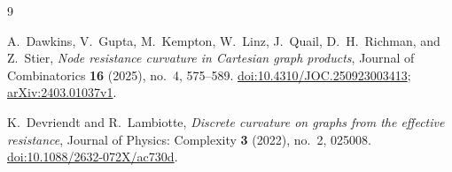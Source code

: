 \documentclass[11pt]{amsart}
\theoremstyle{remark}
\begin{document}
\begin{thebibliography}{9}

A.~Dawkins, V.~Gupta, M.~Kempton, W.~Linz, J.~Quail, D.~H.~Richman,
and Z.~Stier,
\newblock \emph{Node resistance curvature in Cartesian graph products},
\newblock Journal of Combinatorics \textbf{16} (2025), no.~4, 575--589.
\newblock
\href{https://doi.org/10.4310/JOC.250923003413}
{doi:10.4310/JOC.250923003413};
\href{https://arxiv.org/abs/2403.01037v1}{arXiv:2403.01037v1}.

K.~Devriendt and R.~Lambiotte,
\newblock \emph{Discrete curvature on graphs from the effective resistance},
\newblock Journal of Physics: Complexity \textbf{3} (2022), no.~2,
025008.
\newblock
\href{https://doi.org/10.1088/2632-072X/ac730d}
{doi:10.1088/2632-072X/ac730d}.

\end{thebibliography}
\end{document}
